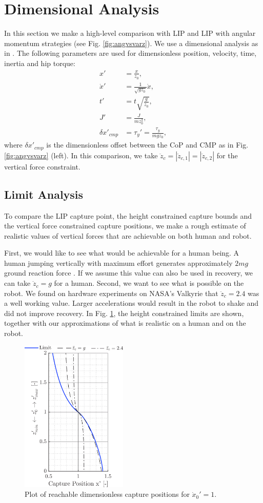 \documentclass[letterpaper, 10 pt, conference]{ieeeconf}  %
\newcommand{\ddzc}{\ddot{z}_{c}}
\newcommand{\ddzcf}{\ddot{z}_{c,1}}
\newcommand{\ddzcs}{\ddot{z}_{c,2}}
\begin{document}
\section{Dimensional Analysis}\label{sec:comparison}
In this section we make a high-level comparison with LIP and LIP with angular momentum strategies (see Fig. \ref{fig:angvsvarz}). We use a dimensional analysis as in \cite{pratt2006capture,stephens2007humanoid,koolen2012capturability}. The following parameters are used for dimensionless position, velocity, time, inertia and hip torque:
\begin{align}
	x' &= \frac{x}{z_0}, \\
	\dot{x}' &= \frac{1}{\sqrt{gz_0}}\dot{x},\\
	t' &= t\sqrt{\frac{g}{z_0}},\\
	J' &= \frac{J}{mz_0^2},\\
	\delta x'_{cmp} &= \tau_y' = \frac{\tau_y}{mgz_0},
\end{align}
where $\delta x'_{cmp}$ is the dimensionless offset between the CoP and CMP as in Fig. \ref{fig:angvsvarz} (left). In this comparison, we take $\ddzc=|\ddzcf|=|\ddzcs|$ for the vertical force constraint.
\subsection{Limit Analysis}
To compare the LIP capture point, the height constrained capture bounds and the vertical force constrained capture positions, we make a rough estimate of realistic values of vertical forces that are achievable on both human and robot.

First, we would like to see what would be achievable for a human being. A human jumping vertically with maximum effort generates approximately $2mg$ ground reaction force \cite{linthorne2001analysis}. If we assume this value can also be used in recovery, we can take $\ddot{z}_c=g$ for a human. Second, we want to see what is possible on the robot. We found on hardware experiments on NASA's Valkyrie that $\ddot{z}_c=2.4$ was a well working value. Larger accelerations would result in the robot to shake and did not improve recovery. In Fig. \ref{fig:caplimits}, the height constrained limits are shown, together with our approximations of what is realistic on a human and on the robot. 
\begin{figure}
      \centering
      \includegraphics[width=2in]{caplimits.png}
      \caption{Plot of reachable dimensionless capture positions for $\dot{x}_0'=1$. }
      \label{fig:caplimits}
\end{figure}
\end{document}
